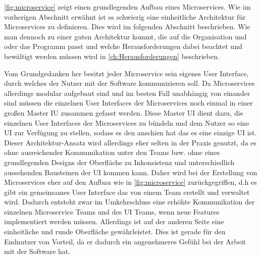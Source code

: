 \newpage

\ref{fig:microservice} zeigt einen grundlegenden Aufbau eines Microservices. Wie im vorherigen Abschnitt erwähnt ist es schwierig eine einheitliche Architektur für Microservices zu definieren. Dies wird im folgenden Abschnitt beschrieben.
Wie man dennoch zu einer guten Architektur kommt, die auf die Organisation und oder das Programm passt und welche Herausforderungen dabei beachtet und bewältigt werden müssen wird in \ref{ch:Herausforderungen} beschrieben.\newline\newline

Vom Grundgedanken her besitzt jeder Microservice sein eigenes User Interface, durch welches der Nutzer mit der Software kommunizieren soll. Da Microservices allerdings modular aufgebaut sind und im besten Fall unabhängig von einander sind müssen die einzelnen User Interfaces der Microservices noch einmal in einer großen Master IU zusammen gefasst werden. Diese Master UI dient dazu, die einzelnen User Interfaces der Microservices zu bündeln und dem Nutzer so eine UI zur Verfügung zu stellen, sodass es den anschien hat das es eine einzige UI ist. Dieser Architektur-Ansatz wird allerdings eher selten in der Praxis genutzt, da es ohne ausreichender Kommunikation unter den Teams bzw. ohne eines grundlegenden Designs der Oberfläche zu Inkonsistenz und unterschiedlich aussehenden Bausteinen der UI kommen kann.
Daher wird bei der Erstellung von Microservices eher auf den Aufbau wie in \ref{fig:microservice} zurückgegriffen, d.h es gibt ein gemeinsames User Interface das von einem Team erstellt und verwaltet wird. Dadurch entsteht zwar im Umkehrschluss eine erhöhte Kommunikation der einzelnen Microservice Teams und des UI Teams, wenn neue Features implementiert werden müssen. Allerdings ist auf der anderen Seite eine einheitliche und runde Oberfläche gewährleistet. Dies ist gerade für den Endnutzer von Vorteil, da er dadurch ein angenehmeres Gefühl bei der Arbeit mit der Software hat.\newline\newline

